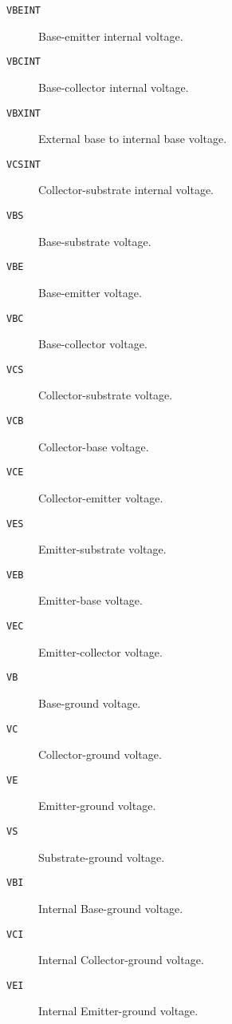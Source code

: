 \begin{description}

\item[{\tt VBEINT}] Base-emitter internal voltage.

\item[{\tt VBCINT}] Base-collector internal voltage.

\item[{\tt VBXINT}] External base to internal base voltage.

\item[{\tt VCSINT}] Collector-substrate internal voltage.

\item[{\tt VBS}] Base-substrate voltage.

\item[{\tt VBE}] Base-emitter voltage.

\item[{\tt VBC}] Base-collector voltage.

\item[{\tt VCS}] Collector-substrate voltage.

\item[{\tt VCB}] Collector-base voltage.

\item[{\tt VCE}] Collector-emitter voltage.

\item[{\tt VES}] Emitter-substrate voltage.

\item[{\tt VEB}] Emitter-base voltage.

\item[{\tt VEC}] Emitter-collector voltage.

\item[{\tt VB}] Base-ground voltage.

\item[{\tt VC}] Collector-ground voltage.

\item[{\tt VE}] Emitter-ground voltage.

\item[{\tt VS}] Substrate-ground voltage.

\item[{\tt VBI}] Internal Base-ground voltage.

\item[{\tt VCI}] Internal Collector-ground voltage.

\item[{\tt VEI}] Internal Emitter-ground voltage.


\end{description}
